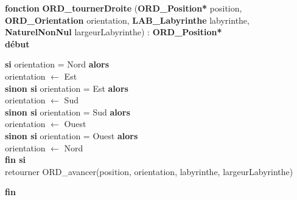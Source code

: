 \documentclass[a4paper, 11pt]{article}
\begin{document}
\noindent\textbf{fonction} \textbf{ORD\_tournerDroite} (\textbf{ORD\_Position*} position, \textbf{ORD\_Orientation} orientation, \textbf{LAB\_Labyrinthe} labyrinthe, \textbf{NaturelNonNul} largeurLabyrinthe) : \textbf{ORD\_Position*}\\
\textbf{début}
\begin{flushleft}
    \hspace*{1cm}\textbf{si} orientation = Nord \textbf{alors}\\
    \hspace*{2cm}orientation $\gets$ Est\\
    \hspace*{1cm}\textbf{sinon si} orientation = Est \textbf{alors}\\
    \hspace*{2cm}orientation $\gets$ Sud\\
    \hspace*{1cm}\textbf{sinon si} orientation = Sud \textbf{alors}\\
    \hspace*{2cm}orientation $\gets$ Ouest\\
    \hspace*{1cm}\textbf{sinon si} orientation = Ouest \textbf{alors}\\
    \hspace*{2cm}orientation $\gets$ Nord\\
    \hspace*{1cm}\textbf{fin si}\\
    \hspace*{1cm}retourner ORD\_avancer(position, orientation, labyrinthe, largeurLabyrinthe)
\end{flushleft}
\textbf{fin}\\
\end{document}

